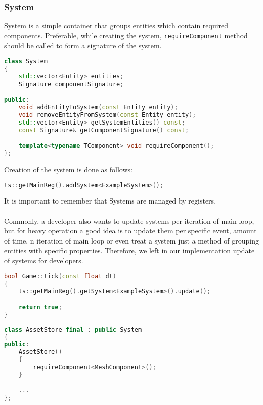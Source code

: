\subsubsection{System}
System is a simple container that groups entities which contain required components. Preferable, while creating the system, \texttt{requireComponent} method should be called to form a signature of the system.
\begin{lstlisting}[language=c++, caption=System class (./engine/include/tsengine/ecs/ecs.h)]
class System
{
    std::vector<Entity> entities;
    Signature componentSignature;

public:
    void addEntityToSystem(const Entity entity);
    void removeEntityFromSystem(const Entity entity);
    std::vector<Entity> getSystemEntities() const;
    const Signature& getComponentSignature() const;

    template<typename TComponent> void requireComponent();
};
\end{lstlisting}

Creation of the system is done as follows:
\begin{lstlisting}[language=c++, caption=Creation of the system (./game/game.cpp)]
    ts::getMainReg().addSystem<ExampleSystem>();
\end{lstlisting}
It is important to remember that Systems are managed by registers.
\\
\\
Commonly, a developer also wants to update systems per iteration of main loop, but for heavy operation a good idea is to update them per specific event, amount of time, n iteration of main loop or even treat a system just a method of grouping entities with specific properties. Therefore, we left in our implementation update of systems for developers.

\begin{lstlisting}[language=c++, caption=Update of systems every iteration of the main loop(./game/game.cpp)]
bool Game::tick(const float dt)
{
    ts::getMainReg().getSystem<ExampleSystem>().update();

    return true;
}
\end{lstlisting}

\begin{lstlisting}[language=c++, caption=System as a method of grouping entities (./game/game.cpp)]
class AssetStore final : public System
{
public:
    AssetStore()
    {
        requireComponent<MeshComponent>();
    }

    ...
};
\end{lstlisting}

